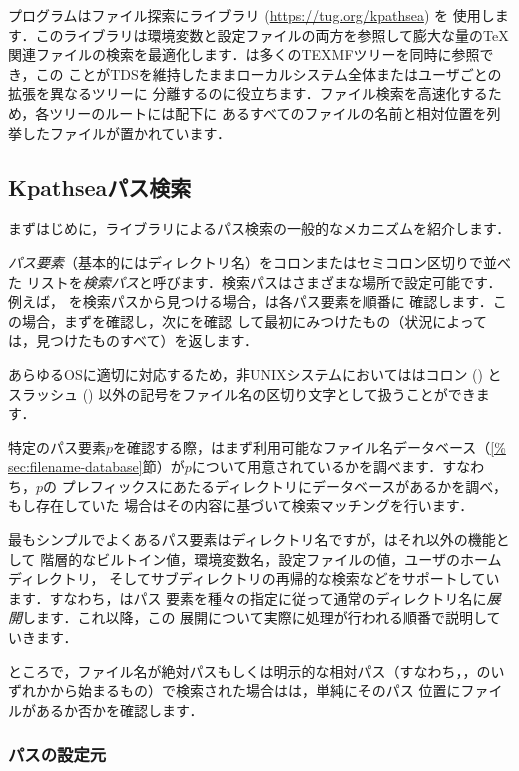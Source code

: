 \documentclass[uplatex,dvipdfmx,tombow]{jsarticle}
\begin{document}
\Webc プログラムはファイル探索に\KPS ライブラリ (\url{https://tug.org/kpathsea}) を
使用します．このライブラリは環境変数と設定ファイルの両方を参照して膨大な量の\TeX
関連ファイルの検索を最適化します．\Webc は多くのTEXMFツリーを同時に参照でき，この
ことがTDSを維持したままローカルシステム全体またはユーザごとの拡張を異なるツリーに
分離するのに役立ちます．ファイル検索を高速化するため，各ツリーのルートには配下に
あるすべてのファイルの名前と相対位置を列挙したファイルが置かれています．

\subsection{Kpathseaパス検索}
\label{sec:kpathsea}

まずはじめに，\KPS ライブラリによるパス検索の一般的なメカニズムを紹介します．

\emph{パス要素}（基本的にはディレクトリ名）をコロンまたはセミコロン区切りで並べた
リストを\emph{検索パス}と呼びます．検索パスはさまざまな場所で設定可能です．例えば，
を検索パスから見つける場合，\KPS は各パス要素を順番に
確認します．この場合，まずを確認し，次にを確認
して最初にみつけたもの（状況によっては，見つけたものすべて）を返します．

あらゆるOSに適切に対応するため，非UNIXシステムにおいては\KPS はコロン (\samp{:}) と
スラッシュ (\samp{/}) 以外の記号をファイル名の区切り文字として扱うことができます．

特定のパス要素$p$を確認する際，\KPS はまず利用可能なファイル名データベース（\ref{%
sec:filename-database}節）が$p$について用意されているかを調べます．すなわち，$p$の
プレフィックスにあたるディレクトリにデータベースがあるかを調べ，もし存在していた
場合はその内容に基づいて検索マッチングを行います．

最もシンプルでよくあるパス要素はディレクトリ名ですが，\KPS はそれ以外の機能として
階層的なビルトイン値，環境変数名，設定ファイルの値，ユーザのホームディレクトリ，
そしてサブディレクトリの再帰的な検索などをサポートしています．すなわち，\KPS はパス
要素を種々の指定に従って通常のディレクトリ名に\emph{展開}します．これ以降，この
展開について実際に処理が行われる順番で説明していきます．

ところで，ファイル名が絶対パスもしくは明示的な相対パス（すなわち\samp{/}，，のいずれかから始まるもの）で検索された場合は\KPS は，単純にそのパス
位置にファイルがあるか否かを確認します．

\subsubsection{パスの設定元}
\label{sec:path-sources}
\end{document}
